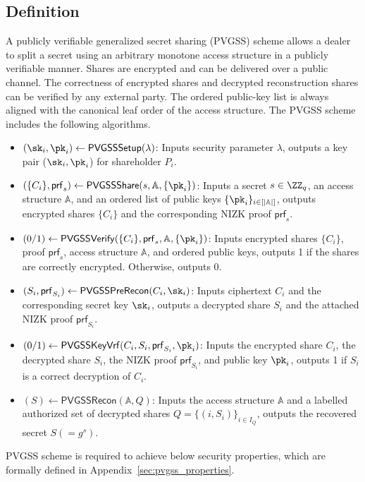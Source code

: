 \documentclass[runningheads]{llncs}
\newcommand{\pvgssSetup}{\mathsf{PVGSSSetup}}
\newcommand{\pvgssShare}{\mathsf{PVGSSShare}}
\newcommand{\pvgssVerify}{\mathsf{PVGSSVerify}}
\newcommand{\pvgssPreRecon}{\mathsf{PVGSSPreRecon}}
\newcommand{\pvgssKeyVrf}{\mathsf{PVGSSKeyVrf}}
\newcommand{\pvgssRecon}{\mathsf{PVGSSRecon}}
\newcommand{\proofs}{\mathsf{prf}}
\begin{document}
\subsection{Definition}
\begin{definition}[PVGSS]\label{def:PVGSS}
 A publicly verifiable generalized secret sharing (PVGSS) scheme allows a dealer to split a secret using an arbitrary monotone access structure in a publicly verifiable manner. Shares are encrypted and can be delivered over a public channel. The correctness of encrypted shares and decrypted reconstruction shares can be verified by any external party. The ordered public-key list is always aligned with the canonical leaf order of the access structure. The PVGSS scheme includes the following algorithms.
\begin{itemize}
    \item $(\sk_i,\pk_i) \gets \pvgssSetup(\lambda)$: Inputs security parameter $\lambda$, outputs a key pair ($\sk_i, \pk_i$) for shareholder $P_i$.
    \item $(\{C_i\}, \proofs_s)\gets \pvgssShare(s,\mathbb{A}, \{\pk_i\})$: Inputs a secret $s\in\ZZ_q$, an access structure $\mathbb{A}$, and an ordered list of public keys $\{\pk_i\}_{i\in[|\mathbb{A}|]}$, outputs encrypted shares $\{C_i\}$ and the corresponding NIZK proof $\proofs_s$.
    \item $(0/1) \gets\pvgssVerify(\{C_i\}, \proofs_s,\mathbb{A},\{\pk_i\})$: Inputs encrypted shares $\{C_i\}$, proof $\proofs_s$, access structure $\mathbb{A}$, and ordered public keys, outputs 1 if the shares are correctly encrypted. Otherwise, outputs 0.
    \item $(S_i, \proofs_{S_i}) \gets \pvgssPreRecon(C_i, \sk_i)$: Inputs ciphertext $C_i$ and the corresponding secret key $\sk_i$, outputs a decrypted share $S_i$ and the attached NIZK proof $\proofs_{S_i}$.
    \item $(0/1) \gets \pvgssKeyVrf(C_i, S_i, \proofs_{S_i}, \pk_i)$: Inputs the encrypted share $C_i$, the decrypted share $S_i$, the NIZK proof $\proofs_{S_i}$, and public key $\pk_i$, outputs 1 if $S_i$ is a correct decryption of $C_i$.
    \item $(S) \gets \pvgssRecon(\mathbb{A},Q)$: Inputs the access structure $\mathbb{A}$ and a labelled authorized set of decrypted shares $Q=\{(i,S_i)\}_{i\in I_Q}$, outputs the recovered secret $S(=g^s)$.
\end{itemize}
\end{definition}

PVGSS scheme is required to achieve below security properties, which are formally defined in Appendix~\ref{sec:pvgss_properties}.
\end{document}
